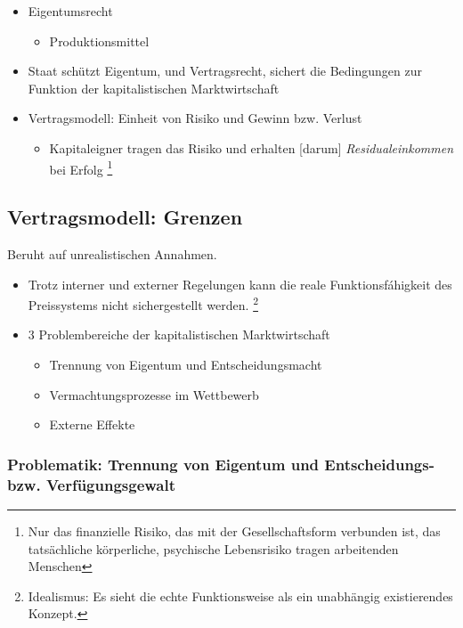 \begin{itemize}
    \item Eigentumsrecht
    \begin{itemize}
        \item Produktionsmittel 
    \end{itemize}
    \item Staat schützt Eigentum, und Vertragsrecht, sichert die Bedingungen zur Funktion der kapitalistischen Marktwirtschaft
    \item Vertragsmodell: Einheit von Risiko und Gewinn bzw. Verlust
    \begin{itemize}
        \item Kapitaleigner tragen das Risiko und erhalten [darum] \textit{Residualeinkommen} bei Erfolg \footnote{Nur das finanzielle Risiko, das mit der Gesellschaftsform verbunden ist, das tatsächliche körperliche, psychische Lebensrisiko tragen arbeitenden Menschen}
    \end{itemize}
\end{itemize} 
\pagebreak
\subsection{Vertragsmodell: Grenzen}
Beruht auf unrealistischen Annahmen.
\begin{itemize}
    \item Trotz interner und externer Regelungen kann die reale Funktionsfáhigkeit des Preissystems nicht sichergestellt werden. \footnote{Idealismus: Es sieht die echte Funktionsweise als ein unabhängig existierendes Konzept.}
    \item 3 Problembereiche der kapitalistischen Marktwirtschaft
    \begin{itemize}
        \item Trennung von Eigentum und Entscheidungsmacht
        \item Vermachtungsprozesse im Wettbewerb
        \item Externe Effekte
    \end{itemize}
\end{itemize}

\subsubsection{Problematik: Trennung von Eigentum und Entscheidungs- bzw. Verfügungsgewalt}

